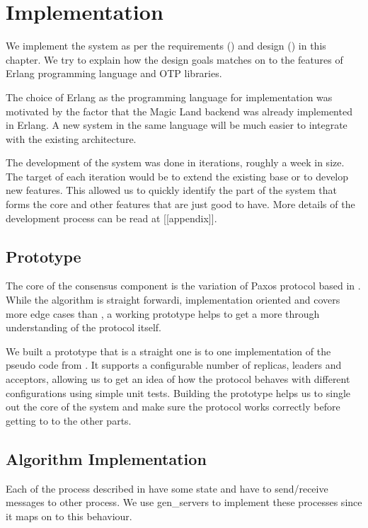\chapter{Implementation}
\label{chapter:implementation}

We implement the system as per the requirements () and 
design () in this chapter. We try to explain how the
design goals matches on to the features of Erlang \citep{erlang} programming
language and OTP libraries.

The choice of Erlang as the programming language for implementation was
motivated by the factor that the Magic Land backend was already implemented in
Erlang. A new system in the same language will be much easier to integrate with
the existing architecture.

The development of the system was done in iterations, roughly a week in size. 
The target of each iteration would be to extend the existing base or to develop 
new features. This allowed us to quickly identify the part of the system that
forms the core and other features that are just good to have. More details of
the development process can be read at [[appendix]].

\section{Prototype}

The core of the consensus component is the variation of Paxos protocol based
in \citet{Robbert2011}. While the algorithm is straight forwardi, implementation
oriented and covers more edge cases than \citet{Lamport01}, a working prototype
helps to get a more through understanding of the protocol itself.

We built a prototype that is a straight one is to one implementation of the 
pseudo code from \citet{Robbert2011}. It supports a configurable number of 
replicas, leaders and acceptors, allowing us to get an idea of how the protocol
behaves with different configurations using simple unit tests. Building the 
prototype helps us to single out the core of the system and make sure the 
protocol works correctly before getting to to the other parts.

\section{Algorithm Implementation}

Each of the process described in  have some state
and have to send/receive messages to other process. We use gen\_servers 
 to implement these processes since it maps on to 
this behaviour.

